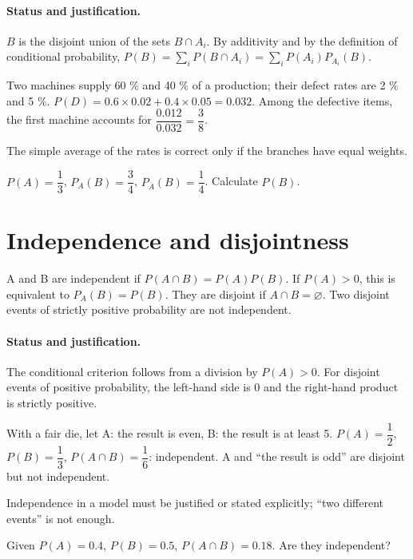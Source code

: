 \paragraph{Status and justification.} $B$ is the disjoint union of the sets $B\cap A_i$. By additivity and by the definition of conditional probability, $P(B)=\sum_iP(B\cap A_i)=\sum_iP(A_i)P_{A_i}(B)$.
\begin{example}Two machines supply 60 \% and 40 \% of a production; their defect rates are 2 \% and 5 \%. $P(D)=0.6\times0.02+0.4\times0.05=0.032$. Among the defective items, the first machine accounts for $\dfrac{0.012}{0.032}=\dfrac{3}{8}$.\end{example}\label{C05-EX2}
\begin{pitfall}The simple average of the rates is correct only if the branches have equal weights.\end{pitfall}
\begin{application}$P(A)=\dfrac{1}{3}$, $P_A(B)=\dfrac{3}{4}$, $P_{\overline A}(B)=\dfrac{1}{4}$. Calculate $P(B)$.\end{application}\label{C05-AP2}
\section{Independence and disjointness}\label{C05-U3}
\begin{keypoint}
A and B are independent if $P(A\cap B)=P(A)P(B)$. If $P(A)>0$, this is equivalent to $P_A(B)=P(B)$. They are disjoint if $A\cap B=\varnothing$. Two disjoint events of strictly positive probability are not independent.
\end{keypoint}
\paragraph{Status and justification.} The conditional criterion follows from a division by $P(A)>0$. For disjoint events of positive probability, the left-hand side is 0 and the right-hand product is strictly positive.
\begin{example}With a fair die, let A: the result is even, B: the result is at least 5. $P(A)=\dfrac{1}{2}$, $P(B)=\dfrac{1}{3}$, $P(A\cap B)=\dfrac{1}{6}$: independent. A and ``the result is odd'' are disjoint but not independent.\end{example}\label{C05-EX3}
\begin{pitfall}Independence in a model must be justified or stated explicitly; ``two different events'' is not enough.\end{pitfall}
\begin{application}Given $P(A)=0.4$, $P(B)=0.5$, $P(A\cap B)=0.18$. Are they independent?\end{application}\label{C05-AP3}
